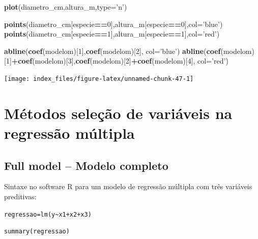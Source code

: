 \documentclass[12pt,brazil,oneside]{book}
\newenvironment{Shaded}{\begin{snugshade}}{\end{snugshade}}
\newcommand{\DataTypeTok}[1]{\textcolor[rgb]{0.13,0.29,0.53}{#1}}
\newcommand{\DecValTok}[1]{\textcolor[rgb]{0.00,0.00,0.81}{#1}}
\newcommand{\KeywordTok}[1]{\textcolor[rgb]{0.13,0.29,0.53}{\textbf{#1}}}
\newcommand{\NormalTok}[1]{#1}
\newcommand{\OperatorTok}[1]{\textcolor[rgb]{0.81,0.36,0.00}{\textbf{#1}}}
\newcommand{\StringTok}[1]{\textcolor[rgb]{0.31,0.60,0.02}{#1}}
\begin{document}
\begin{Shaded}
\begin{Highlighting}[]
\KeywordTok{plot}\NormalTok{(diametro_cm,altura_m,}\DataTypeTok{type=}\StringTok{'n'}\NormalTok{)}

\KeywordTok{points}\NormalTok{(diametro_cm[especie}\OperatorTok{==}\DecValTok{0}\NormalTok{],altura_m[especie}\OperatorTok{==}\DecValTok{0}\NormalTok{],}\DataTypeTok{col=}\StringTok{'blue'}\NormalTok{)}
\KeywordTok{points}\NormalTok{(diametro_cm[especie}\OperatorTok{==}\DecValTok{1}\NormalTok{],altura_m[especie}\OperatorTok{==}\DecValTok{1}\NormalTok{],}\DataTypeTok{col=}\StringTok{'red'}\NormalTok{)}

\KeywordTok{abline}\NormalTok{(}\KeywordTok{coef}\NormalTok{(modelom)[}\DecValTok{1}\NormalTok{],}\KeywordTok{coef}\NormalTok{(modelom)[}\DecValTok{2}\NormalTok{], }\DataTypeTok{col=}\StringTok{'blue'}\NormalTok{)}
\KeywordTok{abline}\NormalTok{(}\KeywordTok{coef}\NormalTok{(modelom)[}\DecValTok{1}\NormalTok{]}\OperatorTok{+}\KeywordTok{coef}\NormalTok{(modelom)[}\DecValTok{3}\NormalTok{],}\KeywordTok{coef}\NormalTok{(modelom)[}\DecValTok{2}\NormalTok{]}\OperatorTok{+}\KeywordTok{coef}\NormalTok{(modelom)[}\DecValTok{4}\NormalTok{], }\DataTypeTok{col=}\StringTok{'red'}\NormalTok{)}
\end{Highlighting}
\end{Shaded}

\begin{center}\texttt{[image: index\_files/figure-latex/unnamed-chunk-47-1]} \end{center}

\hypertarget{metodos-selecao-de-variaveis-na-regressao-multipla}{%
\section{Métodos seleção de variáveis na regressão múltipla}\label{metodos-selecao-de-variaveis-na-regressao-multipla}}

\hypertarget{full-model-modelo-completo}{%
\subsection{Full model -- Modelo completo}\label{full-model-modelo-completo}}

Sintaxe no software R para um modelo de regressão múltipla com três variáveis preditivas:

\texttt{regressao=lm(y\textasciitilde{}x1+x2+x3)}

\texttt{summary(regressao)}
\end{document}
